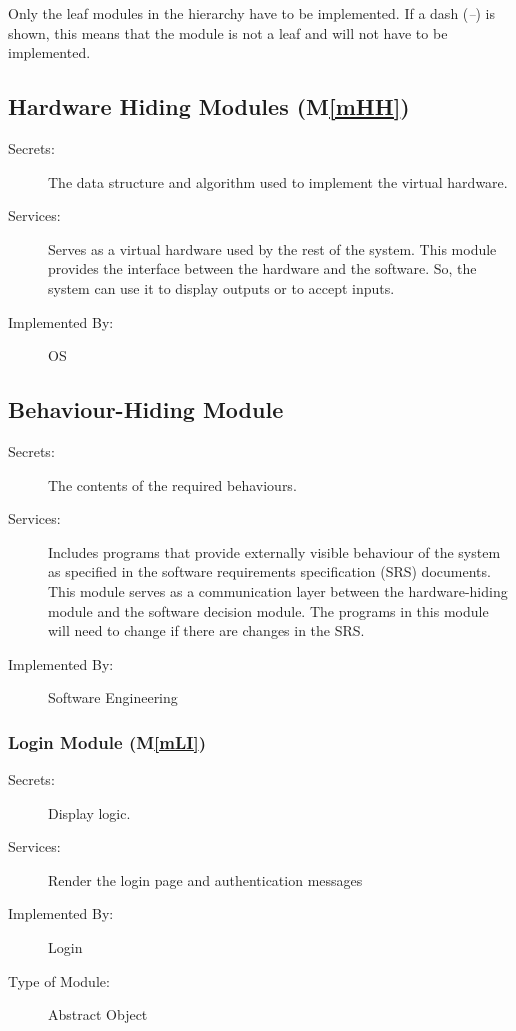 \documentclass[12pt, titlepage]{article}
\newcommand{\mref}[1]{M\ref{#1}}
\begin{document}
Only the leaf modules in the hierarchy have to be implemented. If a dash
(\emph{--}) is shown, this means that the module is not a leaf and will not have
to be implemented.

\subsection{Hardware Hiding Modules (\mref{mHH})}

\begin{description}
\item[Secrets:]The data structure and algorithm used to implement the virtual
  hardware.
\item[Services:]Serves as a virtual hardware used by the rest of the
  system. This module provides the interface between the hardware and the
  software. So, the system can use it to display outputs or to accept inputs.
\item[Implemented By:] OS
\end{description}

\subsection{Behaviour-Hiding Module}

\begin{description}
\item[Secrets:]The contents of the required behaviours.
\item[Services:]Includes programs that provide externally visible behaviour of
  the system as specified in the software requirements specification (SRS)
  documents. This module serves as a communication layer between the
  hardware-hiding module and the software decision module. The programs in this
  module will need to change if there are changes in the SRS.
\item[Implemented By:] Software Engineering
\end{description}

\subsubsection{Login Module (\mref{mLI})}

\begin{description}
\item[Secrets:] Display logic.
\item[Services:] Render the login page and authentication messages
\item[Implemented By:] Login
\item[Type of Module:] Abstract Object
\end{description}
\end{document}
